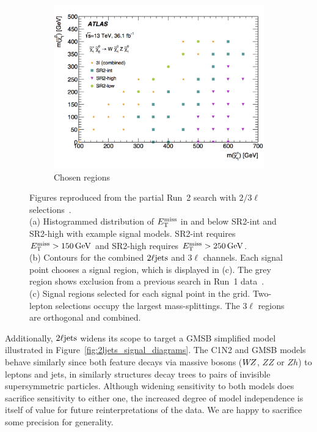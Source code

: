 \begin{figure}[tp]
\begin{subfigure}{0.46\textwidth}
\includegraphics[width=\textwidth]{figures/2ljets_23l_chosen_regions.png}
\caption{Chosen regions}
\end{subfigure}
\caption[
Figures reproduced from the partial Run~2 search with $2/3\ell$ selections
]{%
Figures reproduced from the partial Run~2 search with $2/3\ell$
selections~\cite{atlas_23l_SUSY_2016_24, hepdata.81996}.
\\[0.5em]
(a) Histogrammed distribution of $\met$ in and below SR2-int and SR2-high with
example signal models.
SR2-int requires $\met > 150\,\eV[G]$ and SR2-high requires $\met > 250\,\eV[G]$.
\\[0.5em]
(b) Contours for the combined $\twoljets$ and $3\ell$ channels.
Each signal point chooses a signal region, which is displayed in (c).
The grey region shows exclusion from a previous search in Run~1
data~\cite{atlas_2l_SUSY_2013_11}.
\\[0.5em]
(c) Signal regions selected for each signal point in the grid.
Two-lepton selections occupy the largest mass-splittings.
The $3\ell$ regions are orthogonal and combined.
}
\label{fig:2ljets_23l_stuff}
\end{figure}

Additionally, $\twoljets$ widens its scope to target a GMSB simplified model
illustrated in Figure~\ref{fig:2ljets_signal_diagrams}.
The C1N2 and GMSB models behave similarly since both feature decays via massive
bosons ($W\kern-0.4exZ$, $ZZ$ or $Zh$) to leptons and jets, in similarly structures decay
trees to pairs of invisible supersymmetric particles.
Although widening sensitivity to both models does sacrifice sensitivity to
either one, the increased degree of model independence is itself of value for
future reinterpretations of the data.
We are happy to sacrifice some precision for generality.

